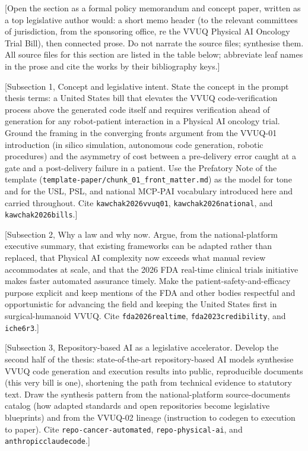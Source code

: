 
[Open the section as a formal policy memorandum and concept paper, written as a
top legislative author would: a short memo header (to the relevant committees of
jurisdiction, from the sponsoring office, re the VVUQ Physical AI Oncology Trial
Bill), then connected prose. Do not narrate the source files; synthesise them.
All source files for this section are listed in the table below; abbreviate leaf
names in the prose and cite the works by their bibliography keys.]

[Subsection 1, Concept and legislative intent. State the concept in the prompt
thesis terms: a United States bill that elevates the VVUQ code-verification
process above the generated code itself and requires verification ahead of
generation for any robot-patient interaction in a Physical AI oncology trial.
Ground the framing in the converging fronts argument from the VVUQ-01
introduction (in silico simulation, autonomous code generation, robotic
procedures) and the asymmetry of cost between a pre-delivery error caught at a
gate and a post-delivery failure in a patient. Use the Prefatory Note of the
template (\texttt{template-paper/chunk\_01\_front\_matter.md}) as the model for
tone and for the USL, PSL, and national MCP-PAI vocabulary introduced here and
carried throughout. Cite \texttt{kawchak2026vvuq01}, \texttt{kawchak2026national},
and \texttt{kawchak2026bills}.]

[Subsection 2, Why a law and why now. Argue, from the national-platform executive
summary, that existing frameworks can be adapted rather than replaced, that
Physical AI complexity now exceeds what manual review accommodates at scale, and
that the 2026 FDA real-time clinical trials initiative makes faster automated
assurance timely. Make the patient-safety-and-efficacy purpose explicit and keep
mentions of the FDA and other bodies respectful and opportunistic for advancing
the field and keeping the United States first in surgical-humanoid VVUQ. Cite
\texttt{fda2026realtime}, \texttt{fda2023credibility}, and \texttt{iche6r3}.]

[Subsection 3, Repository-based AI as a legislative accelerator. Develop the
second half of the thesis: state-of-the-art repository-based AI models synthesise
VVUQ code generation and execution results into public, reproducible documents
(this very bill is one), shortening the path from technical evidence to statutory
text. Draw the synthesis pattern from the national-platform source-documents
catalog (how adapted standards and open repositories become legislative
blueprints) and from the VVUQ-02 lineage (instruction to codegen to execution to
paper). Cite \texttt{repo-cancer-automated}, \texttt{repo-physical-ai}, and
\texttt{anthropicclaudecode}.]

